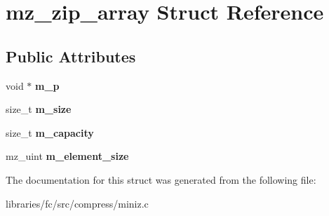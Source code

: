 \hypertarget{structmz__zip__array}{}\section{mz\+\_\+zip\+\_\+array Struct Reference}
\label{structmz__zip__array}
\subsection*{Public Attributes}
\begin{DoxyCompactItemize}
\item 
\mbox{\label{structmz__zip__array_a8054ffa9a3da062a1d7528b124a8b651}} 
void $\ast$ {\bfseries m\+\_\+p}
\item 
\mbox{\label{structmz__zip__array_a00858a0bceae00064e3e0b25bebfd939}} 
size\+\_\+t {\bfseries m\+\_\+size}
\item 
\mbox{\label{structmz__zip__array_abb5fb11f941f23713d9a8ef20930bf68}} 
size\+\_\+t {\bfseries m\+\_\+capacity}
\item 
\mbox{\label{structmz__zip__array_ac3eb7acc1c233ed3c53db813d7d00692}} 
mz\+\_\+uint {\bfseries m\+\_\+element\+\_\+size}
\end{DoxyCompactItemize}


The documentation for this struct was generated from the following file\+:\begin{DoxyCompactItemize}
\item 
libraries/fc/src/compress/miniz.\+c\end{DoxyCompactItemize}
